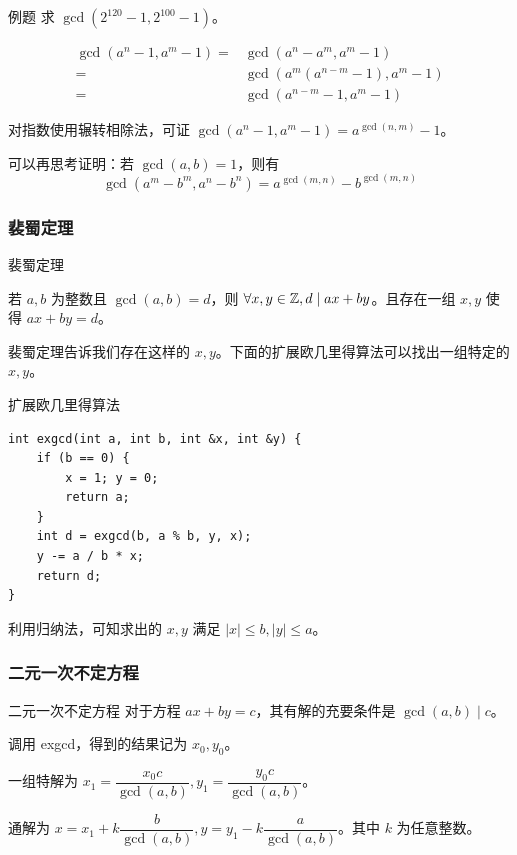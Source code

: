 \documentclass[../main.tex]{subfiles}
\begin{document}
\begin{frame}{例题}
求 $\gcd(2^{120}-1,2^{100}-1)$。 \pause

$$
\begin{aligned}
\gcd(a^n-1,a^m-1)
=&\gcd(a^n-a^m,a^m-1)\\
=&\gcd(a^m(a^{n-m}-1),a^m-1)\\
=&\gcd(a^{n-m}-1,a^m-1)
\end{aligned}
$$ \pause

对指数使用辗转相除法，可证 $\gcd(a^n-1,a^m-1)=a^{\gcd(n,m)}-1$。 \pause

可以再思考证明：若 $\gcd(a,b)=1$，则有
$$
\gcd(a^m-b^m,a^n-b^n)=a^{\gcd(m,n)}-b^{\gcd(m,n)}
$$
\end{frame}

\subsubsection{裴蜀定理}

\begin{frame}{裴蜀定理}
\begin{theo}[裴蜀定理]
若 $a,b$ 为整数且 $\gcd(a,b)=d$，则 $\forall x,y\in\mathbb{Z},d\mid ax+by$。且存在一组 $x,y$ 使得 $ax+by=d$。
\end{theo} \pause
\medskip

裴蜀定理告诉我们存在这样的 $x,y$。下面的扩展欧几里得算法可以找出一组特定的 $x,y$。
\end{frame}

\begin{frame}[fragile]{扩展欧几里得算法}

\begin{lstlisting}
int exgcd(int a, int b, int &x, int &y) {
    if (b == 0) {
        x = 1; y = 0;
        return a;
    }
    int d = exgcd(b, a % b, y, x);
    y -= a / b * x;
    return d;
}
\end{lstlisting} \pause

利用归纳法，可知求出的 $x,y$ 满足 $|x|\le b,|y|\le a$。
\end{frame}

\subsubsection{二元一次不定方程}

\begin{frame}{二元一次不定方程}
对于方程 $ax+by=c$，其有解的充要条件是 $\gcd(a,b)\mid c$。 \pause

调用 exgcd，得到的结果记为 $x_0,y_0$。 \pause
\medskip

一组特解为 $x_1=\dfrac{x_0c}{\gcd(a,b)},y_1=\dfrac{y_0c}{\gcd(a,b)}$。 \pause

通解为 $x=x_1+k\dfrac{b}{\gcd(a,b)},y=y_1-k\dfrac{a}{\gcd(a,b)}$。其中 $k$ 为任意整数。
\end{frame}
\end{document}
